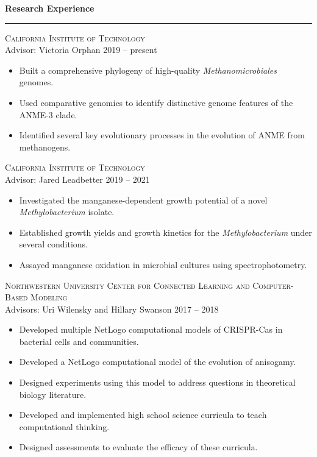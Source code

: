 \documentclass{article}
\newcommand{\cvsection}[1]{%
	{\large \textbf{#1\phantom{,}}}
	\hrule
}
\begin{document}
\cvsection{Research Experience}
\bigskip

\textsc{California Institute of Technology}\\
Advisor: Victoria Orphan	\hfill	2019 -- present
\begin{itemize}[leftmargin=1.5em, nosep, label=$\vcenter{\hbox{\tiny\textbullet}}$]
\item
Built a comprehensive phylogeny of high-quality \emph{Methanomicrobiales} genomes.
\item
Used comparative genomics to identify distinctive genome features of the ANME-3 clade.
\item
Identified several key evolutionary processes in the evolution of ANME from methanogens.
\end{itemize}

\medskip

\textsc{California Institute of Technology}\\
Advisor: Jared Leadbetter	\hfill	2019 -- 2021
\begin{itemize}[leftmargin=1.5em, nosep, label=$\vcenter{\hbox{\tiny\textbullet}}$]
\item
Investigated the manganese-dependent growth potential of a novel \emph{Methylobacterium} isolate.
\item
Established growth yields and growth kinetics for the \emph{Methylobacterium} under several conditions.
\item
Assayed manganese oxidation in microbial cultures using spectrophotometry.
\end{itemize}

\medskip

\textsc{Northwestern University Center for Connected Learning and Computer-Based Modeling}\\
Advisors: Uri Wilensky and Hillary Swanson	\hfill	2017 -- 2018
\begin{itemize}[leftmargin=1.5em, nosep, label=$\vcenter{\hbox{\tiny\textbullet}}$]
\item
Developed multiple NetLogo computational models of CRISPR-Cas in bacterial cells and communities.
\item
Developed a NetLogo computational model of the evolution of anisogamy.
\item
Designed experiments using this model to address questions in theoretical biology literature.
\item
Developed and implemented high school science curricula to teach computational thinking.
\item
Designed assessments to evaluate the efficacy of these curricula.
\end{itemize}
\end{document}
